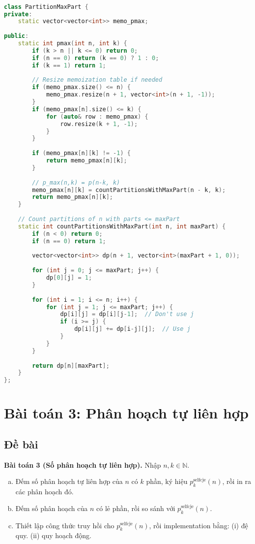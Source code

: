 \documentclass[12pt,a4paper]{article}
\theoremstyle{definition}
\begin{document}
\begin{lstlisting}[language=C++, caption={Tính $p_{\text{max}}(n,k)$}]

class PartitionMaxPart {
private:
    static vector<vector<int>> memo_pmax;
    
public:
    static int pmax(int n, int k) {
        if (k > n || k <= 0) return 0;
        if (n == 0) return (k == 0) ? 1 : 0;
        if (k == 1) return 1;
        
        // Resize memoization table if needed
        if (memo_pmax.size() <= n) {
            memo_pmax.resize(n + 1, vector<int>(n + 1, -1));
        }
        if (memo_pmax[n].size() <= k) {
            for (auto& row : memo_pmax) {
                row.resize(k + 1, -1);
            }
        }
        
        if (memo_pmax[n][k] != -1) {
            return memo_pmax[n][k];
        }
        
        // p_max(n,k) = p(n-k, k)
        memo_pmax[n][k] = countPartitionsWithMaxPart(n - k, k);
        return memo_pmax[n][k];
    }
    
    // Count partitions of n with parts <= maxPart
    static int countPartitionsWithMaxPart(int n, int maxPart) {
        if (n < 0) return 0;
        if (n == 0) return 1;
        
        vector<vector<int>> dp(n + 1, vector<int>(maxPart + 1, 0));
        
        for (int j = 0; j <= maxPart; j++) {
            dp[0][j] = 1;
        }
        
        for (int i = 1; i <= n; i++) {
            for (int j = 1; j <= maxPart; j++) {
                dp[i][j] = dp[i][j-1];  // Don't use j
                if (i >= j) {
                    dp[i][j] += dp[i-j][j];  // Use j
                }
            }
        }
        
        return dp[n][maxPart];
    }
};
\end{lstlisting}

\section{Bài toán 3: Phân hoạch tự liên hợp}

\subsection{Đề bài}

\textbf{Bài toán 3 (Số phân hoạch tự liên hợp).} Nhập $n, k \in \mathbb{N}$. 
\begin{enumerate}[(a)]
\item Đếm số phân hoạch tự liên hợp của $n$ có $k$ phần, ký hiệu $p_k^{\text{selfcje}}(n)$, rồi in ra các phân hoạch đó.
\item Đếm số phân hoạch của $n$ có lẻ phần, rồi so sánh với $p_k^{\text{selfcje}}(n)$.
\item Thiết lập công thức truy hồi cho $p_k^{\text{selfcje}}(n)$, rồi implementation bằng: (i) đệ quy. (ii) quy hoạch động.
\end{enumerate}
\end{document}

